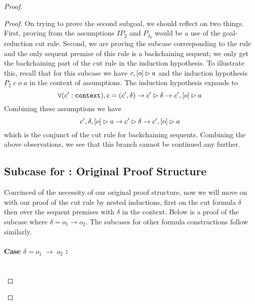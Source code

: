 \begin{proof}
\begin{proof}
On trying to prove the second subgoal, we should reflect on two things. First, proving  from the assumptions $\mathit{IP}_2$ and $P_{3_2}$ would be a use of the goal-reduction cut rule. Second, we are proving the subcase corresponding to the \rlnmsinit{} rule and the only sequent premise of this rule is a backchaining sequent; we only get the backchaining part of the cut rule in the induction hypothesis. To illustrate this, recall that for this subcase we have $\bchsl[c]{o}{a}$ and the induction hypothesis $P_2 \; c \; o \; a$ in the context of assumptions. The induction hypothesis expands to
$$
\forall (\inddyncon{} : \sltm{context}), c = (\inddyncon{}, \delta) \rightarrow \seqsl[\inddyncon{}]{\delta} \rightarrow \bchsl[\inddyncon{}]{o}{a}
$$
Combining these assumptions we have
$$
\bchsl[\inddyncon{} , \delta]{o}{a} \rightarrow \seqsl[\inddyncon{}]{\delta} \rightarrow \bchsl[\inddyncon{}]{o}{a}
$$
which is the conjunct of the cut rule for backchaining sequents. Combining the above observations, we see that this branch cannot be continued any further. \\



\subsection{Subcase for \rlnmsinit{}: Original Proof Structure}
\label{subsec:cutadmissnonseq}

Convinced of the necessity of our original proof structure, now we will move on with our proof of the cut rule by nested inductions, first on the cut formula $\delta$ then over the sequent premises with $\delta$ in the context.
Below is a proof of the \rlnmsinit{} subcase where $\delta = o_1 \longrightarrow o_2$. The \rlnmsinit{} subcases for other formula constructions follow similarly.
%
\paragraph{Case $\delta = o_1 \; \longrightarrow \; o_2$ :} ~\\


\end{proof}
\end{proof}
